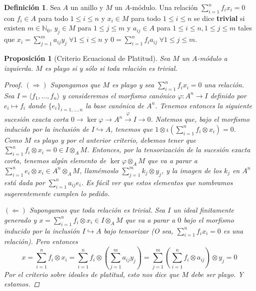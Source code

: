\documentclass[12pt]{book}
\newtheorem{prop}[teo]{Proposición}
\theoremstyle{definition}
\newtheorem{defn}[teo]{Definición}
\begin{document}
\begin{defn}
Sea $A$ un anillo y $M$ un $A$-módulo. Una relación $\displaystyle\sum_{i=1}^n f_ix_i = 0$ con $f_i\in A$ para todo $1\leq i\leq n$ y $x_i\in M$ para todo $1\leq i\leq n$ se dice \textbf{trivial} si existen $m\in\mathbb{N}_0$, $y_j\in M$ para $1\leq j\leq m$ y $a_{ij}\in A$ para $1\leq i \leq n, 1\leq j\leq m$ tales que $x_i = \displaystyle\sum_{j=1}^m a_{ij}y_j \;\forall 1\leq i\leq n$ y $0 = \displaystyle\sum_{i=1}^n f_ia_{ij}\;\forall 1\leq j\leq m$.
\end{defn}

\begin{prop}[Criterio Ecuacional de Platitud]
Sea $M$ un $A$-módulo a izquierda. $M$ es playo si y sólo si toda relación es trivial.
\begin{proof}
$(\Longrightarrow)$ Supongamos que $M$ es playo y sea $\displaystyle\sum_{i=1}^n f_ix_i =0$ una relación. Sea $I=\langle f_1,\ldots , f_n\rangle$ y consideremos el morfismo canónico $\varphi: A^n\to I$ definido por $e_i\mapsto f_i$ donde $\{e_i\}_{i=1,\ldots ,n}$ la base canónica de $A^n$. Tenemos entonces la siguiente sucesión exacta corta $0\longrightarrow \ker \varphi\longrightarrow A^n \stackrel{\varphi}{\longrightarrow} I\longrightarrow 0$. Notemos que, bajo el morfismo inducido por la inclusión de $I\hookrightarrow A$, tenemos que $1\otimes \iota \left(\displaystyle\sum_{i=1}^n f_i\otimes x_i\right) = 0$. Como $M$ es playo y por el anterior criterio, debemos tener que $\displaystyle\sum_{i=1}^n f_i\otimes x_i = 0\in I\otimes_A M$. Entonces, por la tensorización de la sucesión exacta corta, tenemos algún elemento de $\ker\varphi\otimes_A M$ que va a parar a $\displaystyle\sum_{i=1}^n e_i \otimes x_i\in A^n\otimes_A M$, llamémoslo $\displaystyle\sum_{j=1}^m k_j\otimes y_j$, y la imagen de los $k_j$ en $A^n$ está dada por $\displaystyle\sum_{i=1}^n a_{ij}e_i$. Es fácil ver que estos elementos que nombramos sugerentemente cumplen lo pedido.

$(\Longleftarrow)$ Supongamos que toda relación es trivial. Sea $I$ un ideal finitamente generado y $x=\displaystyle\sum_{i=1}^n f_i\otimes x_i \in I\otimes_A M$ que va a parar a $0$ bajo el morfismo inducido por la inclusión $I\hookrightarrow A$ bajo tensorizar (O sea, $\displaystyle\sum_{i=1}^n f_ix_i = 0$ es una relación). Pero entonces $$x =\displaystyle\sum_{i=1}^n f_i\otimes x_i = \sum_{i=1}^n f_i\otimes \left( \sum_{j=1}^m a_{ij}y_j\right) = \displaystyle\sum_{j=1}^m \left( \sum_{i=1}^n f_i\otimes a_{ij}\right)\otimes y_j = 0$$ Por el criterio sobre ideales de platitud, esto nos dice que $M$ debe ser playo. Y estamos.
\end{proof}
\end{prop}
\end{document}
